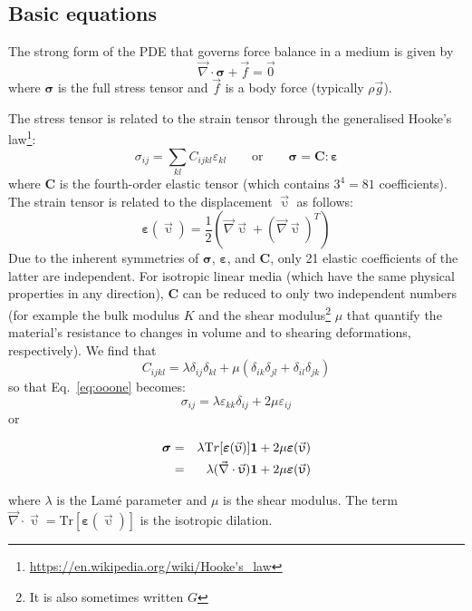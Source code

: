 \subsection{Basic equations}

The strong form of the PDE that governs force balance in a medium is given by
\[
\vec{\nabla}\cdot{\bm \sigma}  + \vec{f} = \vec{0}
\]
where ${\bm \sigma}$ is the full stress tensor and $\vec{f}$ is a body force
(typically $\rho \vec{g}$).

The stress tensor is related to the strain tensor through the generalised 
Hooke's law\footnote{\url{https://en.wikipedia.org/wiki/Hooke's_law}}:
\begin{equation}
\sigma_{ij}=\sum_{kl}C_{ijkl}\varepsilon_{kl} 
\qquad
\text{or}
\qquad
{\bm \sigma} = {\bm C} : {\bm \varepsilon}
\label{eq:ooone}
\end{equation}
where ${\bm C}$ is the fourth-order elastic tensor (which contains $3^4=81$ coefficients).
The strain tensor is related to the displacement $\vec{\upupsilon}$ as follows: 
\begin{equation}
{\bm \varepsilon}(\vec{\upupsilon}) 
= \frac{1}{2}(\vec{\nabla}\vec{\upupsilon} + (\vec{\nabla}\vec{\upupsilon})^T)
\end{equation}
Due to the inherent symmetries of ${\bm \sigma}$, ${\bm \varepsilon}$, and ${\bm C}$, 
only 21 elastic coefficients of the latter are independent. For isotropic linear media (which have the same physical properties in any direction), ${\bm C}$ can be reduced to only two independent numbers (for example the bulk modulus $K$ and the shear modulus\footnote{It is also sometimes written $G$} $\mu$ that quantify the material's resistance to changes in volume and to shearing deformations, respectively).
We find that
\[
C_{ijkl} = \lambda \delta_{ij}\delta_{kl} + \mu (\delta_{ik}\delta_{jl}+\delta_{il}\delta_{jk})
\]
so that Eq.~\eqref{eq:ooone} becomes:
\[
\sigma_{ij}=\lambda \varepsilon_{kk} \delta_{ij} + 2\mu \varepsilon_{ij}
\]
or
\begin{mdframed}[backgroundcolor=blue!5]
\begin{eqnarray}
{\bm \sigma}
&=&\lambda {\text Tr}[{\bm \varepsilon}(\vec{\upupsilon})] {\bm 1} 
+2\mu {\bm \varepsilon}(\vec{\upupsilon})
\nonumber\\
&=&\lambda (\vec{\nabla}\cdot\vec{\upupsilon}) {\bm 1} +2\mu {\bm \varepsilon}(\vec{\upupsilon}) 
\label{eq:twooELAST}
\end{eqnarray}
\end{mdframed}
where $\lambda$ is the Lam\'e parameter and $\mu$ is the shear modulus. The term $\vec{\nabla}\cdot\vec{\upupsilon}=\text{Tr}[{\bm \varepsilon}(\vec{\upupsilon})]$ is the isotropic dilation.

